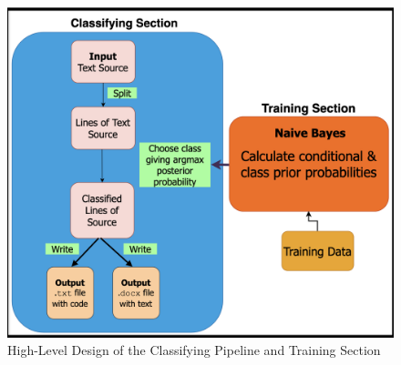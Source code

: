 \documentclass[12pt]{scrreprt}
\begin{document}
\begin{figure}[h]
    \centering
    \includegraphics[width=1.0\textwidth]{figures/NB-high-design.png}
    \caption{High-Level Design of the Classifying Pipeline and Training Section}
    \label{fig:high-level-design}
\end{figure}
\end{document}
